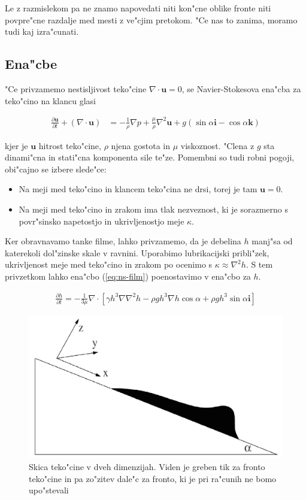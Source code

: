 \documentclass[a4paper,10pt]{article}
\renewcommand{\vec}{\mathbf}
\begin{document}
Le z razmislekom pa ne znamo napovedati niti kon"cne oblike fronte niti povpre"cne razdalje med mesti z ve"cjim pretokom. "Ce nas to zanima, moramo tudi kaj izra"cunati. 

\subsection{Ena"cbe}

"Ce privzamemo nestisljivost teko"cine $\nabla \cdot \vec u = 0$, se Navier-Stokesova ena"cba za teko"cino na klancu glasi 

\begin{align}
 \label{eq:ns-film}
 \frac{\partial \vec u}{\partial t} + (\nabla \cdot \vec u) &= -\frac{1}{\rho}\nabla p + \frac{\mu}{\rho}\nabla^2 \vec u + g (\sin \alpha \vec i - \cos \alpha \vec k)
\end{align}

kjer je $\vec u$ hitrost teko"cine, $\rho$ njena gostota in $\mu$ viskoznost. "Clena z $g$ sta dinami"cna in stati"cna komponenta sile te"ze. Pomembni so tudi robni pogoji, obi"cajno se izbere slede"ce:

\begin{itemize}
 \item Na meji med teko"cino in klancem teko"cina ne drsi, torej je tam $\vec u = 0$. 
 \item Na meji med teko"cino in zrakom ima tlak nezveznost, ki je sorazmerno s povr"sinsko napetostjo in ukrivljenostjo meje $\kappa$. 
\end{itemize}

Ker obravnavamo tanke filme, lahko privzamemo, da je debelina $h$ manj"sa od katerekoli dol"zinske skale v ravnini. Uporabimo lubrikacijski pribli"zek, ukrivljenost meje med teko"cino in zrakom po ocenimo s $\kappa \approx \nabla^2 h$. S tem privzetkom lahko ena"cbo (\ref{eq:ns-film}) poenostavimo v ena"cbo za $h$. 

\begin{align}
\label{eq:ns-film-h}
 \frac{\partial h}{\partial t} = -\frac{1}{3\mu}\nabla \cdot \left[ \gamma h^3 \nabla \nabla^2 h - \rho g h^3 \nabla h \cos \alpha + \rho g h^3 \sin \alpha \vec i \right]
\end{align}

\begin{figure}[h]
\centering
 \includegraphics[width=.8\textwidth]{./Slike/film-skica}
\caption{Skica teko"cine v dveh dimenzijah. Viden je greben tik za fronto teko"cine in pa zo"zitev dale"c za fronto, ki je pri ra"cunih ne bomo upo"stevali}
\label{fig:film-skica}
\end{figure}
\end{document}
